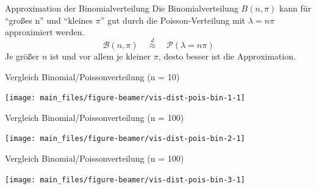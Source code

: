\documentclass[
  10pt,
  ignorenonframetext,
]{beamer}
\begin{document}
\begin{frame}{Approximation der Binomialverteilung}
\label{approximation-der-binomialverteilung}
Die Binomialverteilung \(B(n, \pi)\) kann für ``großes n'' und ``kleines
\(\pi\)'' gut durch die Poisson-Verteilung mit \(\lambda = n \pi\)
approximiert werden. \[
{\mathcal B}(n, \pi) \quad \stackrel{d}{\approx} \quad {\mathcal P}(\lambda = n \pi)
\] Je größer \(n\) ist und vor allem je kleiner \(\pi\), desto besser
ist die Approximation.
\end{frame}

\begin{frame}{Vergleich Binomial/Poissonverteilung (n = 10)}
\label{vergleich-binomialpoissonverteilung-n-10}
\scriptsize

\begin{center}\texttt{[image: main\_files/figure-beamer/vis-dist-pois-bin-1-1]} \end{center}

\normalsize
\end{frame}

\begin{frame}{Vergleich Binomial/Poissonverteilung (n = 100)}
\label{vergleich-binomialpoissonverteilung-n-100}
\scriptsize

\begin{center}\texttt{[image: main\_files/figure-beamer/vis-dist-pois-bin-2-1]} \end{center}

\normalsize
\end{frame}

\begin{frame}{Vergleich Binomial/Poissonverteilung (n = 100)}
\label{vergleich-binomialpoissonverteilung-n-100-1}
\scriptsize

\begin{center}\texttt{[image: main\_files/figure-beamer/vis-dist-pois-bin-3-1]} \end{center}

\normalsize
\end{frame}
\end{document}
